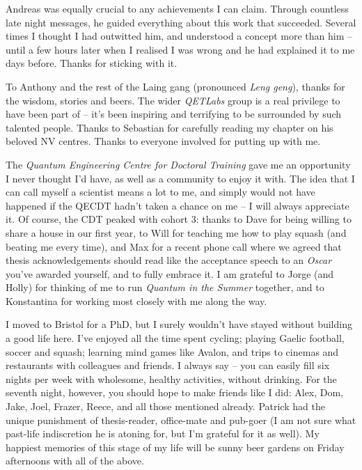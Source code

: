 Andreas was equally crucial to any achievements I can claim. 
Through countless late night messages, he guided everything about this work that succeeded. 
Several times I thought I had outwitted him, and understood a concept more than him -- 
    until a few hours later when I realised I was wrong and he had explained it to me days before. 
Thanks for sticking with it. 
\par 

To Anthony and the rest of the Laing gang (pronounced \emph{Leng geng}), 
    thanks for the wisdom, stories and beers.
The wider \emph{QETLabs} group is a real privilege to have been part of -- 
    it's been inspiring and terrifying to be surrounded by such talented people.
Thanks to Sebastian for carefully reading my chapter on his beloved NV centres.
Thanks to everyone involved for putting up with me. 
\par

The \emph{Quantum Engineering Centre for Doctoral Training} gave me an opportunity I 
    never thought I'd have, as well as a community to enjoy it with. 
The idea that I can call myself a scientist means a lot to me, 
    and simply would not have happened if the QECDT hadn't taken a chance on me -- 
    I will always appreciate it. 
Of course, the CDT peaked with cohort 3:
    thanks to Dave for being willing to share a house in our first year, 
    to Will for teaching me how to play squash (and beating me every time), 
    and Max for a recent phone call where we agreed that thesis acknowledgements should
    read like the acceptance speech to an \emph{Oscar} you've awarded yourself, and to fully embrace it. 
I am grateful to Jorge (and Holly) for thinking of me to run \emph{Quantum in the Summer} together,
    and to Konstantina for working most closely with me along the way.  
\par 

I moved to Bristol for a PhD, 
    but I surely wouldn't have stayed without building a good life here. 
I've enjoyed all the time spent cycling; playing Gaelic football, soccer and squash;
    learning mind games like Avalon, and trips to cinemas and restaurants with colleagues and friends. 
I always say -- you can easily fill six nights per week with wholesome, healthy activities, 
    without drinking. 
For the seventh night, however, you should hope to make friends like I did:
    Alex, Dom, Jake, Joel, Frazer, Reece, and all those mentioned already.
Patrick had the unique punishment of thesis-reader, office-mate and pub-goer 
    (I am not sure what past-life indiscretion he is atoning for, but I'm grateful for it as well). 
My happiest memories of this stage of my life will be sunny beer gardens on Friday afternoons with all of the above. 

